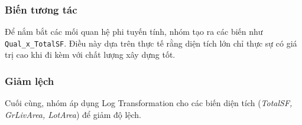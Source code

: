 \subsubsection{Biến tương tác}
\indent Để nắm bắt các mối quan hệ phi tuyến tính, nhóm tạo ra các biến như \texttt{Qual\_x\_TotalSF}. Điều này dựa trên thực tế rằng diện tích lớn chỉ thực sự có giá trị cao khi đi kèm với chất lượng xây dựng tốt. 
\subsubsection{Giảm lệch}
Cuối cùng, nhóm áp dụng Log Transformation cho các biến diện tích (\textit{TotalSF, GrLivArea, LotArea}) để giảm độ lệch.